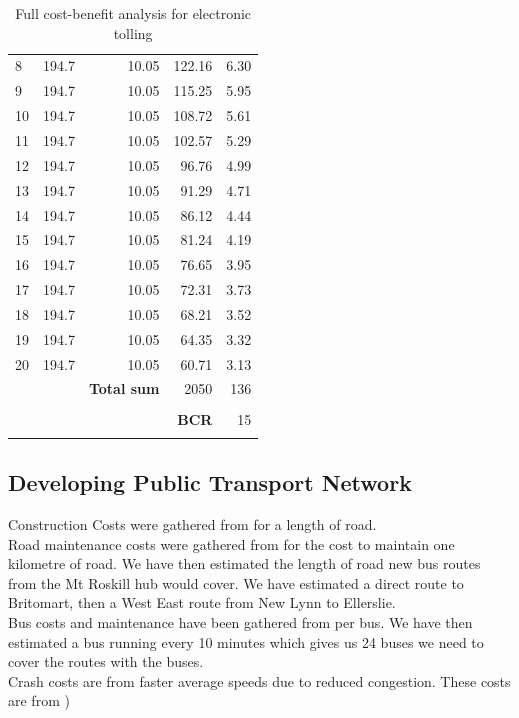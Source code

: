 \documentclass[twoside, a4paper, 11pt]{article}
\begin{document}
\begin{table}[H]
{\begin{tabular}{|l|r|r|r|r|}
8  & 194.7 & 10.05 & 122.16 & 6.30  \\
9  & 194.7 & 10.05 & 115.25 & 5.95  \\
10 & 194.7 & 10.05 & 108.72 & 5.61  \\
11 & 194.7 & 10.05 & 102.57 & 5.29  \\
12 & 194.7 & 10.05 & 96.76  & 4.99  \\
13 & 194.7 & 10.05 & 91.29  & 4.71  \\
14 & 194.7 & 10.05 & 86.12  & 4.44  \\
15 & 194.7 & 10.05 & 81.24  & 4.19  \\
16 & 194.7 & 10.05 & 76.65  & 3.95  \\
17 & 194.7 & 10.05 & 72.31  & 3.73  \\
18 & 194.7 & 10.05 & 68.21  & 3.52  \\
19 & 194.7 & 10.05 & 64.35  & 3.32  \\
20 & 194.7 & 10.05 & 60.71  & 3.13  \\
&&\textbf{Total sum}&  2050  &136\\
&&&&\\
&&&\cellcolor{green}\textbf{BCR}&\cellcolor{green}15\\
\Xhline{2\arrayrulewidth}
\end{tabular}
}
\caption{Full cost-benefit analysis for electronic tolling}
\label{bcaet}
\end{table}
\newpage

\subsection{Developing Public Transport Network}
Construction Costs were gathered from \cite[p.~45]{wallis15} for a length of road.\\

Road maintenance costs were gathered from \cite{MattL13} for the cost to maintain one kilometre of road. We have then estimated the length of road new bus routes from the Mt Roskill hub would cover. We have estimated a direct route to Britomart, then a West East route from New Lynn to Ellerslie.\\

Bus costs and maintenance have been gathered from \cite{nightowler12} per bus. We have then estimated a bus running every 10 minutes which gives us 24 buses we need to cover the routes with the buses.\\

Crash costs are from faster average speeds due to reduced congestion. These costs are from \cite[p.~45]{wallis15})\\
\end{document}
